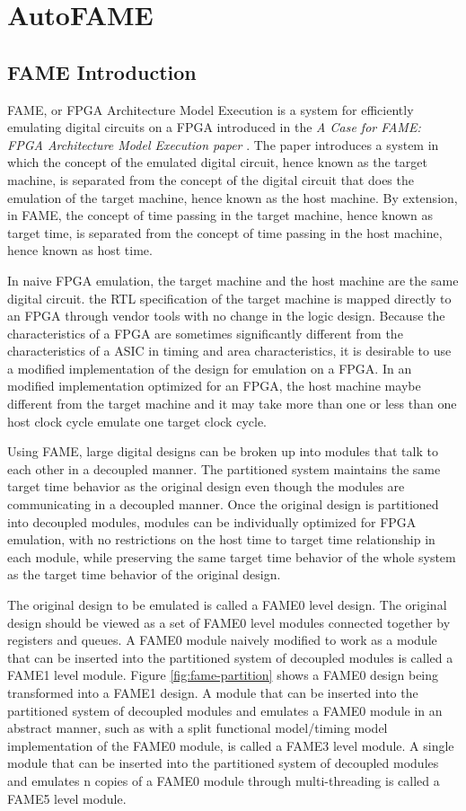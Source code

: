 \section{AutoFAME}
\subsection{FAME Introduction}
FAME, or FPGA Architecture Model Execution is a system for efficiently emulating digital circuits on a FPGA introduced in the \textit{A Case for FAME: FPGA Architecture Model Execution paper} \cite{FAME:2010}. The paper introduces a system in which the concept of the emulated digital circuit, hence known as the target machine, is separated from the concept of the digital circuit that does the emulation of the target machine, hence known as the host machine. By extension, in FAME, the concept of time passing in the target machine, hence known as target time, is separated from the concept of time passing in the host machine, hence known as host time. 

In naive FPGA emulation, the target machine and the host machine are the same digital circuit. the RTL specification of the target machine is mapped directly to an FPGA through vendor tools with no change in the logic design. Because the characteristics of a FPGA are sometimes significantly different from the characteristics of a ASIC in timing and area characteristics, it is desirable to use a modified implementation of the design for emulation on a FPGA. In an modified implementation optimized for an FPGA, the host machine maybe different from the target machine and it may take more than one or less than one host clock cycle emulate one target clock cycle.

Using FAME, large digital designs can be broken up into modules that talk to each other in a decoupled manner. The partitioned system maintains the same target time behavior as the original design even though the modules are communicating in a decoupled manner. Once the original design is partitioned into decoupled modules, modules can be individually optimized for FPGA emulation, with no restrictions on the host time to target time relationship in each module, while preserving the same target time behavior of the whole system as the target time behavior of the original design.

The original design to be emulated is called a FAME0 level design. The original design should be viewed as a set of FAME0 level modules connected together by registers and queues. A FAME0 module naively modified to work as a module that can be inserted into the partitioned system of decoupled modules is called a FAME1 level module. Figure \ref{fig:fame-partition} shows a FAME0 design being transformed into a FAME1 design. A module that can be inserted into the partitioned system of decoupled modules and emulates a FAME0 module in an abstract manner, such as with a split functional model/timing model implementation of the FAME0 module, is called a FAME3 level module. A single module that can be inserted into the partitioned system of decoupled modules and emulates n copies of a FAME0 module through multi-threading is called a FAME5 level module. 

